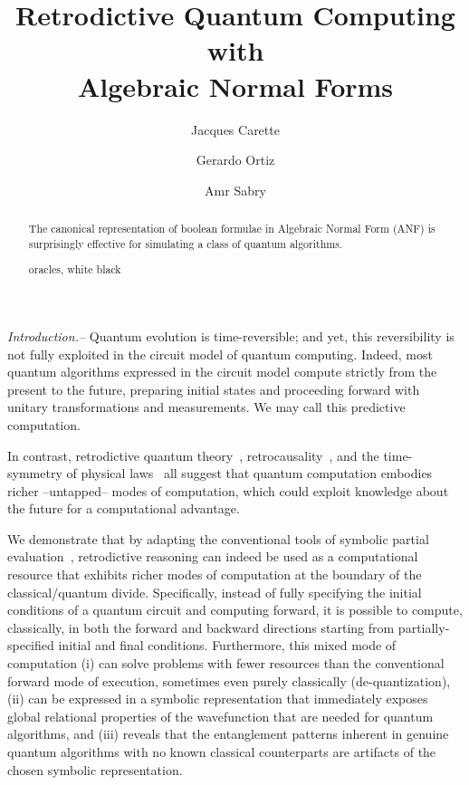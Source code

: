 \documentclass[aps,prl,twocolumn,superscriptaddress,floatfix,notitlepage]{revtex4-2}
\begin{document}
\title{Retrodictive Quantum Computing with \\
Algebraic Normal Forms}

\begin{abstract}
The canonical representation of boolean formulae in Algebraic Normal
Form (ANF) is surprisingly effective for simulating a class of quantum
algorithms.

oracles, white black
\end{abstract}

\author{Jacques Carette }
\author{Gerardo Ortiz }
\author{Amr Sabry }

\maketitle

{\it Introduction.--} Quantum evolution is time-reversible; and yet,
this reversibility is not fully exploited in the circuit model of
quantum computing. Indeed, most quantum algorithms expressed in the
circuit model compute strictly from the present to the future,
preparing initial states and proceeding forward with unitary
transformations and measurements. We may call this predictive
computation.

In contrast, retrodictive quantum
theory~\cite{sym13040586}, retrocausality~\cite{Aharonov2008}, and the
time-symmetry of physical laws~\cite{RevModPhys.27.179} all suggest
that quantum computation embodies richer --untapped-- modes of
computation, which could exploit knowledge about the future for a
computational advantage.

We demonstrate that by adapting the conventional tools of symbolic
partial evaluation~\cite{futamura}, retrodictive reasoning can indeed
be used as a computational resource that exhibits richer modes of
computation at the boundary of the classical/quantum
divide. Specifically, instead of fully specifying the initial
conditions of a quantum circuit and computing forward, it is possible
to compute, classically, in both the forward and backward directions
starting from partially-specified initial and final
conditions. Furthermore, this mixed mode of computation (i) can solve
problems with fewer resources than the conventional forward mode of
execution, sometimes even purely classically (de-quantization), (ii)
can be expressed in a symbolic representation that immediately exposes
global relational properties of the wavefunction that are needed for
quantum algorithms, and (iii) reveals that the entanglement patterns
inherent in genuine quantum algorithms with no known classical
counterparts are artifacts of the chosen symbolic representation.
\end{document}
